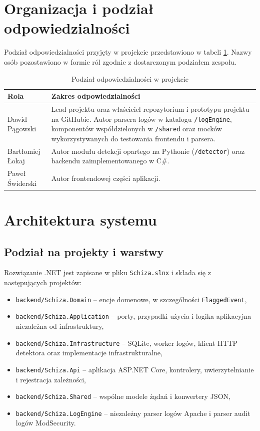 \documentclass[12pt,a4paper]{article}
\def\authorA{Dawid Pągowski}
\def\authorB{Bartłomiej Łokaj}
\def\authorC{Paweł Świderski}
\newcommand{\code}[1]{\texttt{#1}}
\begin{document}
\section{Organizacja i podział odpowiedzialności}

Podział odpowiedzialności przyjęty w projekcie przedstawiono w tabeli
\ref{tab:roles}. Nazwy osób pozostawiono w formie ról zgodnie z dostarczonym
podziałem zespołu.

\begin{table}[H]
    \centering
    \caption{Podział odpowiedzialności w projekcie}
    \label{tab:roles}
    \begin{tabular}{p{}p{}}
        \toprule
        \textbf{Rola} & \textbf{Zakres odpowiedzialności} \\
        \midrule
        \authorA & Lead projektu oraz właściciel repozytorium i prototypu projektu
        na GitHubie. Autor parsera logów w katalogu \code{/logEngine},
        komponentów współdzielonych w \code{/shared} oraz mocków
        wykorzystywanych do testowania frontendu i parsera. \\
        \authorB & Autor modułu detekcji opartego na Pythonie
        (\code{/detector}) oraz backendu
        zaimplementowanego w C\#. \\
        \authorC & Autor frontendowej części aplikacji. \\
        \bottomrule
    \end{tabular}
\end{table}


\section{Architektura systemu}

\subsection{Podział na projekty i warstwy}

Rozwiązanie .NET jest zapisane w pliku \code{Schiza.slnx} i składa się z
następujących projektów:

\begin{itemize}
    \item \code{backend/Schiza.Domain} -- encje domenowe, w szczególności
    \code{FlaggedEvent},
    \item \code{backend/Schiza.Application} -- porty, przypadki użycia
    i logika aplikacyjna niezależna od infrastruktury,
    \item \code{backend/Schiza.Infrastructure} -- SQLite, worker logów,
    klient HTTP detektora oraz implementacje infrastrukturalne,
    \item \code{backend/Schiza.Api} -- aplikacja ASP.NET Core, kontrolery,
    uwierzytelnianie i rejestracja zależności,
    \item \code{backend/Schiza.Shared} -- wspólne modele żądań i konwertery JSON,
    \item \code{backend/Schiza.LogEngine} -- niezależny parser logów Apache
    i parser audit logów ModSecurity.
\end{itemize}
\end{document}
